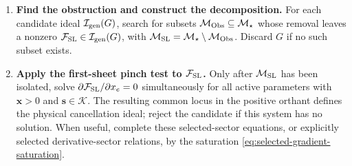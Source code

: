 \documentclass[a4paper,11pt]{article}
\newcommand{\x}{\boldsymbol{x}}
\newcommand{\s}{\boldsymbol{s}}
\newcommand{\K}{\mathcal K}
\newcommand{\FSL}{\mathcal F_{\rm SL}}
\newcommand{\MSL}{\mathcal M_{\rm SL}}
\newcommand{\MObs}{\mathcal M_{\rm Obs}}
\begin{document}
\begin{enumerate}[label=\textbf{\arabic*.},leftmargin=*]
\item \textbf{Find the obstruction and construct the decomposition.}
      For each candidate ideal \(\mathcal I_{\rm gen}(G)\), search for subsets
      \(\MObs\subseteq\mathcal M_\star\) whose removal leaves a nonzero
      \(\FSL\in\mathcal I_{\rm gen}(G)\), with
      \(\MSL=\mathcal M_\star\setminus\MObs\).  Discard \(G\) if no such
      subset exists.
\item \textbf{Apply the first-sheet pinch test to \(\FSL\).}
      Only after \(\MSL\) has been isolated, solve
      \(\partial\FSL/\partial x_e=0\) simultaneously for all active
      parameters with \(\x>0\) and \(\s\in\K\).  The resulting common locus
      in the positive orthant defines the physical cancellation ideal; reject
      the candidate if this system has no solution.  When useful, complete these
      selected-sector equations, or explicitly selected derivative-sector
      relations, by the saturation \eqref{eq:selected-gradient-saturation}.


\end{enumerate}
\end{document}

